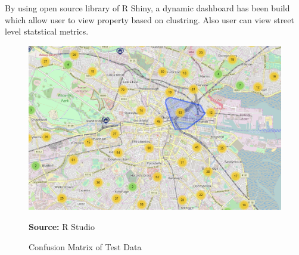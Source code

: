 By using open source library of R Shiny, a dynamic dashboard has been build which allow user to view property based on clustring. Also user can view street level statstical metrics.

\begin{center}
\begin{figure}[!htb]
\includegraphics[width=\textwidth]{rmap.png}
\centering
\caption{Confusion Matrix of Test Data}{\textbf{Source:} R Studio}
\label{fig:rmap}
\end{figure}
\end{center}


